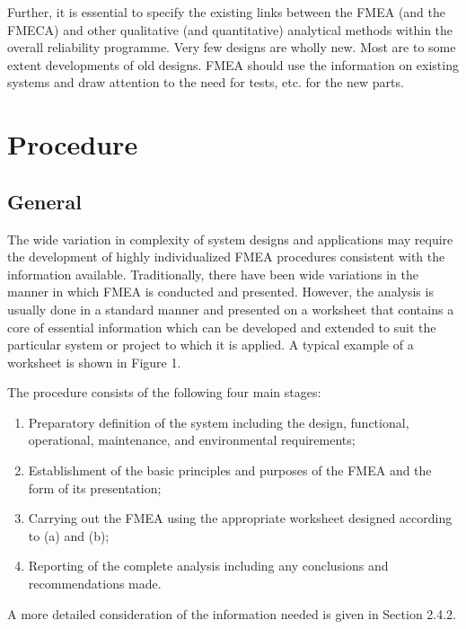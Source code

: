 \documentclass[./dissertation.tex]{subfiles}
\begin{document}
Further, it is essential to specify the existing links between the FMEA (and the FMECA) and other qualitative (and quantitative) analytical methods within the overall reliability programme.  Very few designs are wholly new. Most are to some extent developments of old designs. FMEA should use the information on existing systems and draw attention to the need for tests, etc. for the new parts.  



\section{Procedure}

\subsection{General}
The wide variation in complexity of system designs and applications may require the development of highly individualized FMEA procedures consistent with the information available. Traditionally, there have been wide variations in the manner in which FMEA is conducted and presented. However, the analysis is usually done in a standard manner and presented on a worksheet that contains a core of essential information which can be developed and extended to suit the particular system or project to which it is applied. A typical example of a worksheet is shown in Figure 1.

The procedure consists of the following four main stages:

\begin{enumerate}
\item Preparatory definition of the system including the design, functional, operational, maintenance, and environmental requirements;
\item Establishment of the basic principles and purposes of the FMEA and the form of its presentation;
\item Carrying out the FMEA using the appropriate worksheet designed according to (a) and (b);
\item Reporting of the complete analysis including any conclusions and recommendations made.
\end{enumerate}

A more detailed consideration of the information needed is given in Section 2.4.2.
\end{document}
